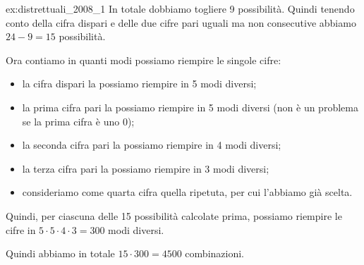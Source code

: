 \begin{soluzione}{ex:distrettuali_2008_1}
    In totale dobbiamo togliere 9 possibilità.
    Quindi tenendo conto della cifra dispari e delle due cifre pari uguali ma non consecutive abbiamo $24 - 9 = 15$
    possibilità.

    Ora contiamo in quanti modi possiamo riempire le singole cifre:
    \begin{itemize}
        \item la cifra dispari la possiamo riempire in 5 modi diversi;
        \item la prima cifra pari la possiamo riempire in 5 modi diversi (non è un problema se la prima cifra è uno 0);
        \item la seconda cifra pari la possiamo riempire in 4 modi diversi;
        \item la terza cifra pari la possiamo riempire in 3 modi diversi;
        \item consideriamo come quarta cifra quella ripetuta, per cui l'abbiamo già scelta.
    \end{itemize}

    Quindi, per ciascuna delle 15 possibilità calcolate prima, possiamo riempire le cifre in
    $5 \cdot 5 \cdot 4 \cdot 3 = 300$ modi diversi.

    Quindi abbiamo in totale $15 \cdot 300 = 4500$ combinazioni.
\end{soluzione}

